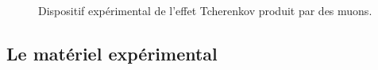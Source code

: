 \begin{figure}[!h]
    \caption{\label{fig:dispo2} Dispositif expérimental de l'effet Tcherenkov produit par des muons.}
\end{figure}


\subsection{Le matériel expérimental}


\pagebreak